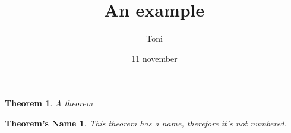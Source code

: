 \documentclass{article}
\title{An example}
\author{Toni}
\date{11 november}
\newtheorem{theorem0}{Theorem}
\newtheorem*{theorem1}{Theorem's Name}
\begin{document}
\begin{theorem0}
    A theorem
\end{theorem0}

\begin{theorem1}
    This theorem has a name, therefore it's not numbered.\end{theorem1}
\end{document}
